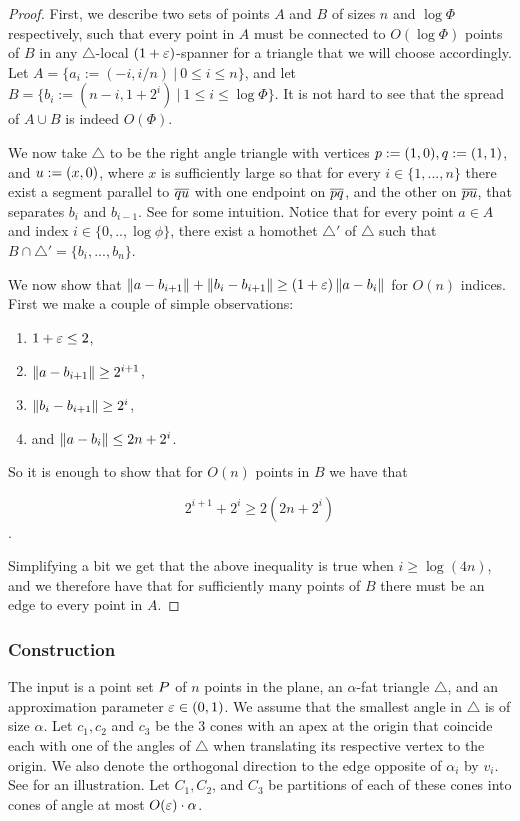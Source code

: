 \documentclass[12pt]{article}%
\begin{document}
\begin{proof}
	First, we describe two sets of points $A$ and $B$ of sizes $n$ and $\log\Phi$ respectively, such that every point in $A$ must be connected to $O(\log\Phi)$ points of $B$ in any $\triangle$-local $(1+\varepsilon)$-spanner for a triangle that we will choose accordingly. 
	Let $A = \{a_i:=(-i, i/n) ~|~ 0\leq i \leq n \}$, and let $B = \{b_i:=(n-i, 1+2^i) ~|~ 1\leq i \leq \log\Phi \}$. It is not hard to see that the spread of $A \cup B$ is indeed $O(\Phi)$.
	
	We now take $\triangle$ to be the right angle triangle with vertices $p :=(1,0), q :=(1,1)$, and $u:=(x,0)$, where $x$ is sufficiently large so that for every $i\in \{1,...,n\}$ there exist a segment parallel to $\overline{qu}$ with one endpoint on $\overline{pq}$, and the other on $\overline{pu}$, that separates $b_i$ and $b_{i-1}$. See  for some intuition.
	Notice that for every point $a\in A$ and index $i\in \{0,..,\log\phi\}$, there exist a homothet $\triangle'$ of $\triangle$ such that $B\cap \triangle'=\{b_i,...,b_n\}$. 
	
	We now show that $\left\| a - b_{i+1} \right\| + \left\| b_{i} - b_{i+1} \right\| \geq (1+\varepsilon) \left\| a - b_{i} \right\|$ for $O(n)$ indices. First we make a couple of simple observations:
	
	\begin{enumerate}
		\item $1+\varepsilon \leq 2$,
		\item $\left\| a - b_{i+1} \right\|\geq 2^{i+1}$,
		\item $\left\| b_{i} - b_{i+1} \right\| \geq 2^i$,
		\item and $ \left\| a - b_{i} \right\| \leq 2n + 2^i $.
	\end{enumerate}

	So it is enough to show that for $O(n)$ points in $B$ we have that
	
	$$2^{i+1} + 2^{i} \geq 2(2n + 2^i)$$.
	
	Simplifying a bit we get that the above inequality is true when $i \geq \log(4n)$, and we therefore have that for sufficiently many points of $B$ there must be an edge to every point in $A$. 
	

	
	
\end{proof}
\subsubsection{Construction}
\label{tri_construction}
The input is a point set $P$ of $n$ points in the plane, an $\alpha$-fat triangle $\triangle$, and an
approximation parameter $\varepsilon \in (0,1)$. We assume that the smallest angle in $\triangle$ is of size $\alpha$. Let $c_1,c_2$ and $c_3$ be the 3 cones with an apex at the origin that coincide each with one of the angles of $\triangle$ when translating its respective vertex to the origin. We also denote the orthogonal direction to the edge opposite of $\alpha_i$ by $v_i$. See  for an illustration. Let $C_1,C_2$, and $C_3$ be partitions of each of these cones into cones of angle at most $O(\varepsilon)\cdot \alpha$.
\end{document}
